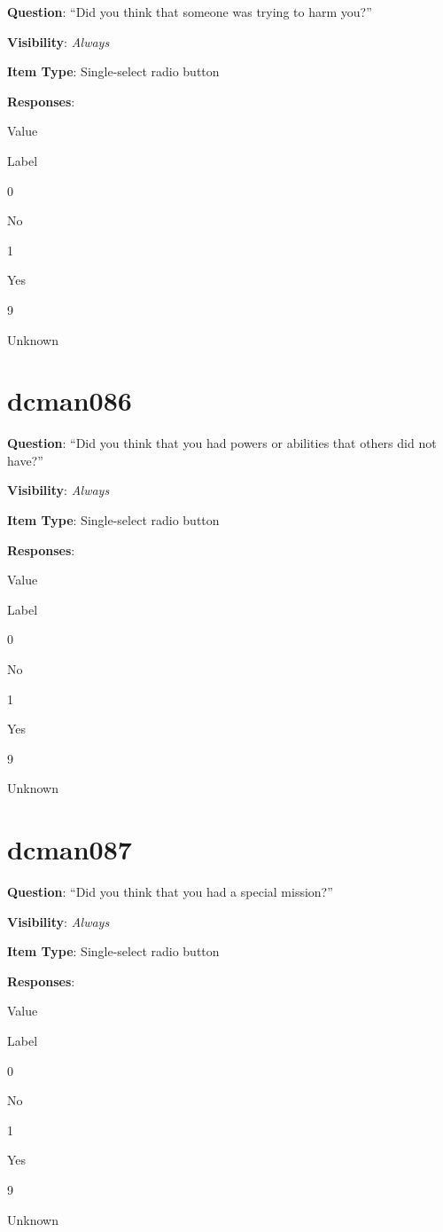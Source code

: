 \documentclass[]{book}
\begin{document}
\textbf{Question}: ``Did you think that someone was trying to harm you?''

\textbf{Visibility}: \emph{Always}

\textbf{Item Type}: Single-select radio button

\textbf{Responses}:

Value

Label

0

No

1

Yes

9

Unknown

\hypertarget{dcman086}{%
\section{dcman086}\label{dcman086}}

\textbf{Question}: ``Did you think that you had powers or abilities that others did not have?''

\textbf{Visibility}: \emph{Always}

\textbf{Item Type}: Single-select radio button

\textbf{Responses}:

Value

Label

0

No

1

Yes

9

Unknown

\hypertarget{dcman087}{%
\section{dcman087}\label{dcman087}}

\textbf{Question}: ``Did you think that you had a special mission?''

\textbf{Visibility}: \emph{Always}

\textbf{Item Type}: Single-select radio button

\textbf{Responses}:

Value

Label

0

No

1

Yes

9

Unknown
\end{document}
